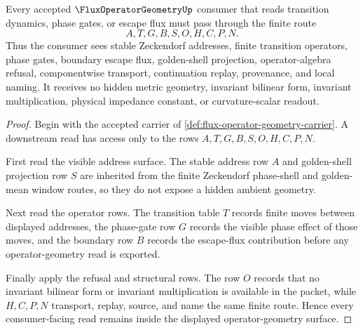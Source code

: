\begin{theorem}
\label{thm:flux-operator-geometry-boundary-route}
Every accepted $\FluxOperatorGeometryUp$ consumer that reads transition dynamics, phase gates, or escape flux must pass through the finite route
$$
A,T,G,B,S,O,H,C,P,N .
$$
Thus the consumer sees stable Zeckendorf addresses, finite transition operators, phase gates, boundary escape flux, golden-shell projection, operator-algebra refusal, componentwise transport, continuation replay, provenance, and local naming. It receives no hidden metric geometry, invariant bilinear form, invariant multiplication, physical impedance constant, or curvature-scalar readout.
\end{theorem}
\begin{proof}
Begin with the accepted carrier of \autoref{def:flux-operator-geometry-carrier}. A downstream read has access only to the rows $A,T,G,B,S,O,H,C,P,N$.

First read the visible address surface. The stable address row $A$ and golden-shell projection row $S$ are inherited from the finite Zeckendorf phase-shell and golden-mean window routes, so they do not expose a hidden ambient geometry.

Next read the operator rows. The transition table $T$ records finite moves between displayed addresses, the phase-gate row $G$ records the visible phase effect of those moves, and the boundary row $B$ records the escape-flux contribution before any operator-geometry read is exported.

Finally apply the refusal and structural rows. The row $O$ records that no invariant bilinear form or invariant multiplication is available in the packet, while $H,C,P,N$ transport, replay, source, and name the same finite route. Hence every consumer-facing read remains inside the displayed operator-geometry surface.
\end{proof}



